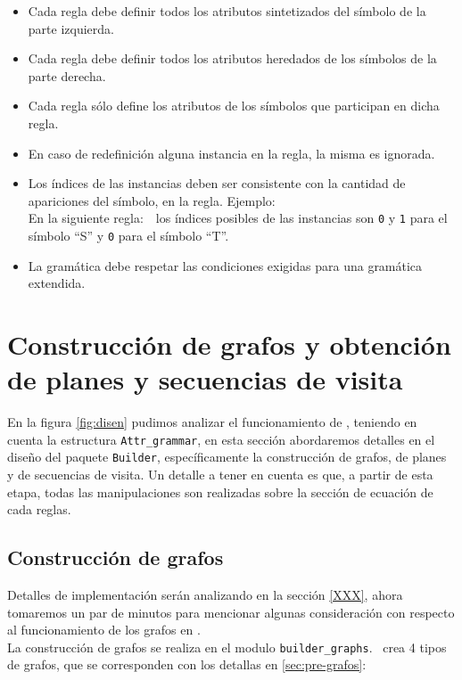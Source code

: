\begin{description}
\begin{itemize}
\item Cada regla debe definir todos los atributos sintetizados del símbolo de la parte izquierda.
\item Cada regla debe definir todos los atributos heredados de los símbolos de la parte derecha.
\item Cada regla sólo define los atributos de los símbolos que participan en dicha regla.
\item En caso de redefinición alguna instancia en la regla, la misma es ignorada.
\item Los índices de las instancias deben ser consistente con la cantidad de apariciones del símbolo, en la regla. Ejemplo: \\En la siguiente regla:\ \ los índices posibles de las instancias son \texttt{0} y \texttt{1} para el símbolo ``S'' y \texttt{0} para el símbolo ``T''.
\item La gramática debe respetar las condiciones exigidas para una gramática extendida. 
\end{itemize}
\end{description}

\section{Construcción de grafos y obtención de planes y secuencias de visita}

En la figura \ref{fig:disen} pudimos analizar el funcionamiento de \maggen, teniendo en cuenta la estructura \texttt{Attr\_grammar}, en esta sección abordaremos detalles en el diseño del paquete \texttt{Builder}, específicamente la construcción de grafos, de planes y de secuencias de visita. Un detalle a tener en cuenta es que, a partir de esta etapa, todas las manipulaciones son realizadas sobre la sección de ecuación de cada reglas.

\subsection*{Construcción de grafos}
\label{subsec:graph}

Detalles de implementación serán analizando en la sección \ref{XXX}, ahora tomaremos un par de minutos para mencionar algunas consideración con respecto al funcionamiento de los grafos en \maggen.\\

La construcción de grafos se realiza en el modulo \texttt{builder\_graphs}. \maggen\ crea 4 tipos de grafos, que se corresponden con los detallas en \ref{sec:pre-grafos}:

